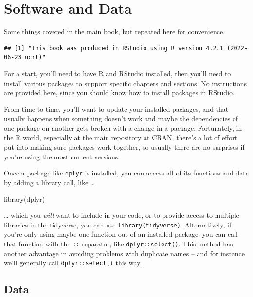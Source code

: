 \documentclass[
]{book}
\newenvironment{Shaded}{\begin{snugshade}}{\end{snugshade}}
\newcommand{\FunctionTok}[1]{\textcolor[rgb]{0,0,0}{#1}}
\newcommand{\NormalTok}[1]{#1}
\begin{document}
\hypertarget{software-and-data}{%
\section{Software and Data}\label{software-and-data}}

Some things covered in the main book, but repeated here for convenience.

\begin{verbatim}
## [1] "This book was produced in RStudio using R version 4.2.1 (2022-06-23 ucrt)"
\end{verbatim}

For a start, you'll need to have R and RStudio installed, then you'll need to install various packages to support specific chapters and sections. No instructions are provided here, since you should know how to install packages in RStudio.

From time to time, you'll want to update your installed packages, and that usually happens when something doesn't work and maybe the dependencies of one package on another gets broken with a change in a package. Fortunately, in the R world, especially at the main repository at CRAN, there's a lot of effort put into making sure packages work together, so usually there are no surprises if you're using the most current versions.

Once a package like \texttt{dplyr} is installed, you can access all of its functions and data by adding a library call, like \ldots{}

\begin{Shaded}
\begin{Highlighting}[]
\FunctionTok{library}\NormalTok{(dplyr)}
\end{Highlighting}
\end{Shaded}

\ldots{} which you \emph{will} want to include in your code, or to provide access to multiple libraries in the tidyverse, you can use \texttt{library(tidyverse)}. Alternatively, if you're only using maybe one function out of an installed package, you can call that function with the \texttt{::} separator, like \texttt{dplyr::select()}. This method has another advantage in avoiding problems with duplicate names -- and for instance we'll generally call \texttt{dplyr::select()} this way.

\hypertarget{data}{%
\subsection{Data}\label{data}}
\end{document}
